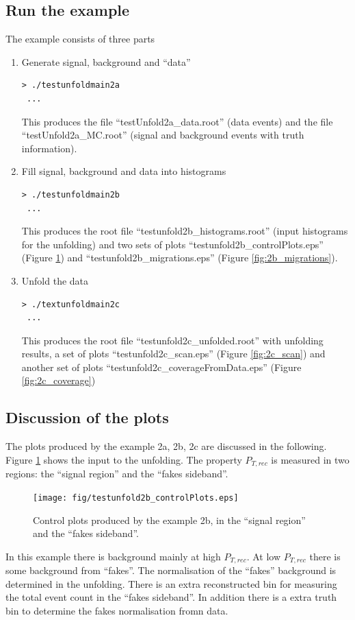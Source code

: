 \documentclass[12pt]{article}
\begin{document}
\subsection{Run the example}
The example consists of three parts
\begin{enumerate}
\item Generate signal, background and ``data''
\begin{verbatim}
> ./testunfoldmain2a 
 ...
\end{verbatim}
This produces the file ``testUnfold2a\_data.root'' (data events) and
the file ``testUnfold2a\_MC.root'' (signal and background events with
truth information).
\item Fill signal, background and data into histograms
\begin{verbatim}
> ./testunfoldmain2b
 ...
\end{verbatim}
This produces the root file
``testunfold2b\_histograms.root'' (input histograms for the unfolding)
and two sets of plots 
``testunfold2b\_controlPlots.eps'' (Figure \ref{fig:2b_controlPlots})
and
``testunfold2b\_migrations.eps'' (Figure \ref{fig:2b_migrations}).
\item Unfold the data
\begin{verbatim}
> ./textunfoldmain2c
 ...
\end{verbatim}
This produces the root file ``testunfold2c\_unfolded.root'' with
unfolding results, a set of plots ``testunfold2c\_scan.eps'' (Figure
\ref{fig:2c_scan}) and another set of plots ``testunfold2c\_coverageFromData.eps'' (Figure
\ref{fig:2c_coverage})
\end{enumerate}

\subsection{Discussion of the plots}

The plots produced by the example 2a, 2b, 2c are discussed in the
following. Figure \ref{fig:2b_controlPlots} shows the input to the
unfolding. The property $P_{T,rec}$ is measured in two regions: the
``signal region'' and the ``fakes sideband''.
\begin{figure}
\begin{center}
\texttt{[image: fig/testunfold2b\_controlPlots.eps]}
\end{center}
\caption{\label{fig:2b_controlPlots} Control plots produced by the
  example 2b, in the ``signal region'' and the ``fakes sideband''.}
\end{figure}
In this example there is background mainly at high $P_{T,rec}$. At low
$P_{T,rec}$ there is some background from ``fakes''. The normalisation
of the ``fakes'' background is determined in the unfolding. There is
an extra reconstructed bin for measuring the total event count in the
``fakes sideband''. In addition there is a extra truth bin to determine
the fakes normalisation fromn data.
\end{document}
